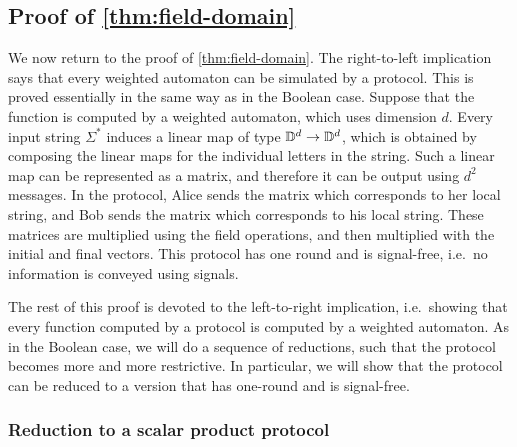 \subsection{Proof of \cref{thm:field-domain}}
\label{sec:proof-of-thm-field-domain}
We now return to the proof of \cref{thm:field-domain}. The right-to-left implication says that every weighted automaton can be simulated by a protocol. This is proved essentially in the same way as in the Boolean case. Suppose that the function is computed by a weighted automaton, which uses  dimension $d$. Every input string $\Sigma^*$ induces a linear map of type $\mathbb D^d \to \mathbb D^d$, which is obtained by composing the linear maps for the individual letters in the string.  Such a linear map can be represented as a matrix, and therefore it can be output using $d^2$ messages.  In the protocol, Alice sends the matrix  which corresponds to her local string, and Bob sends the  matrix which corresponds to  his local string. These matrices are multiplied using the field operations, and then multiplied with the initial and final vectors. This protocol has one round and is signal-free, i.e.~no information is conveyed using signals.


The rest of this proof is devoted to the left-to-right implication, i.e.~showing that every function computed by a protocol is computed by a weighted automaton. As in the Boolean case, we will do a sequence of reductions, such that the protocol becomes more and more restrictive. In particular, we will show that the protocol can be reduced to a version that has one-round and  is signal-free.

\subsubsection{Reduction to a scalar product protocol}
\label{sec:reduction-to-scalar-product-protocols}

